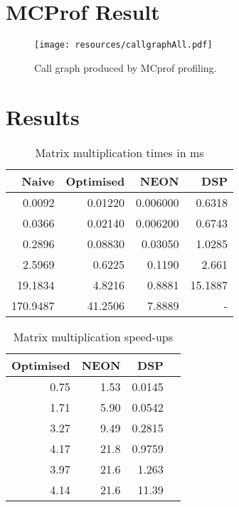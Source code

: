 \documentclass[final]{article} %
\begin{document}
\begin{appendices}

\section{MCProf Result}\label{app:appendix-mcprof-result}

\begin{figure}[H]
\centering
\texttt{[image: resources/callgraphAll.pdf]}
\caption{Call graph produced by MCprof profiling.}
\label{fig:callgraphall}
\end{figure}

\section{Results}\label{app:results}
\begin{table}[H]
\centering
\caption{Matrix multiplication times in ms}
\label{tab:results}
\begin{tabular}{rrrr}
\toprule
Naive & Optimised & NEON & DSP \\
\midrule
	0.0092 & 0.01220 & 0.006000 & 0.6318\\
	0.0366 & 0.02140 & 0.006200 & 0.6743\\
	0.2896 & 0.08830 & 0.03050 & 1.0285\\
	2.5969 & 0.6225 & 0.1190 & 2.661\\
	19.1834 & 4.8216 & 0.8881 & 15.1887\\
	170.9487 & 41.2506 & 7.8889 & - \\
\bottomrule
\end{tabular}
\end{table}

\begin{table}[H]
\centering
\caption{Matrix multiplication speed-ups}
\label{tab:results2}
\begin{tabular}{rrrr}
\toprule
Optimised & NEON & DSP \\
\midrule
0.75 & 1.53 & 0.0145 \\
1.71 & 5.90 & 0.0542 \\
3.27 & 9.49 & 0.2815 \\
4.17 & 21.8 & 0.9759 \\
3.97 & 21.6 & 1.263 \\
4.14 & 21.6 & 11.39 \\
\bottomrule
\end{tabular}
\end{table}


\end{appendices}
\end{document}

